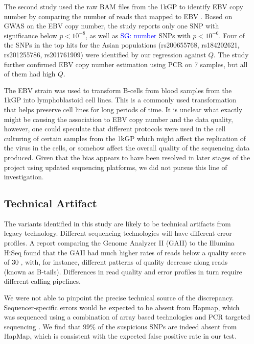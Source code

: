 \documentclass[9pt,lineno]{elife}
\newcommand{\sgcomment}[1]{\textcolor{blue}{SG: #1}}
\begin{document}
The second study used the raw BAM files from the 1kGP to identify EBV copy number by comparing the number of reads that mapped to EBV \citep{Mandage2017}.
Based on GWAS on the EBV copy number, the study reports only one SNP with significance below $ p < 10^{-8}$, as well as \sgcomment{number} SNPs with $ p < 10^{-6}$. 
Four of the SNPs in the top hits for the Asian populations (rs200655768, rs184202621, rs201255786, rs201761909) were identified by our regression against $Q$. The study further confirmed EBV copy number estimation using PCR on 7 samples, but all of them had high $Q$.


The EBV strain was used to transform B-cells from blood samples from the 1kGP into lymphoblastoid cell lines.
This is a commonly used transformation that helps preserve cell lines for long periods of time.
It is unclear what exactly might be causing the association to EBV copy number and the data quality, however, one could speculate that different protocols were used in the cell culturing of certain samples from the 1kGP which might affect the replication of the virus in the cells, or somehow affect the overall quality of the sequencing data produced. Given that the bias appears to have been resolved in later stages of the project using updated sequencing platforms, we did not pursue this line of investigation. 

\subsection{Technical Artifact}
The variants identified in this study are likely to be technical artifacts from legacy technology.
Different sequencing technologies will have different error profiles. 
A report comparing the Genome Analyzer II (GAII) to the Illumina HiSeq found that the GAII had much higher rates of reads below a quality score of 30 \citep{Minoche2011}, with, for instance, different patterns of quality decrease along reads (known as B-tails). 
Differences in read quality and error profiles in turn require different calling pipelines.

We were not able to pinpoint the precise technical source of the discrepancy. 
Sequencer-specific errors would be expected to be absent from Hapmap, which was sequenced using a combination of array based technologies and PCR targeted sequencing \citep{HapMap2005}. 
We find that $99\%$ of the suspicious SNPs are indeed absent from HapMap, which is consistent with the expected false positive rate in our test.
  
\end{document}
